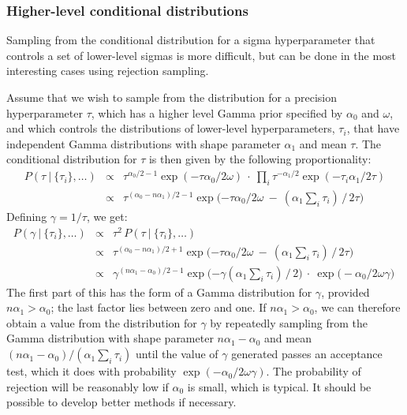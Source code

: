 \documentclass{report}[11pt]
\def\beq{\begin{eqnarray}}
\def\eeq{\end{eqnarray}}
\begin{document}
\subsubsection*{Higher-level conditional distributions}

Sampling from the conditional distribution for a sigma hyperparameter
that controls a set of lower-level sigmas is more difficult, but can
be done in the most interesting cases using rejection sampling.

Assume that we wish to sample from the distribution for a precision
hyperparameter $\tau$, which has a higher level Gamma prior specified
by $\alpha_0$ and $\omega$, and which controls the distributions of
lower-level hyperparameters, $\tau_i$, that have independent Gamma
distributions with shape parameter $\alpha_1$ and mean $\tau$.  The
conditional distribution for $\tau$ is then given by the following
proportionality:\beq
  P(\tau\ |\ \{\tau_i\}, \ldots) & \propto &
    \tau^{\alpha_0/2-1} \exp(-\tau\alpha_0/2\omega) \ \cdot\ 
    \prod_i \tau^{-\alpha_1/2} \exp(-\tau_i\alpha_1/2\tau) \\[3pt]
  & \propto &
    \tau^{(\alpha_0-n\alpha_1)/2-1} 
    \exp\Big({\textstyle-\tau\alpha_0/2\omega
           \ -\ (\alpha_1\sum\limits_i \tau_i)\,\big/\,2\tau}\Big)
\eeq%
Defining $\gamma=1/\tau$, we get:\beq
  P(\gamma\ |\ \{\tau_i\}, \ldots) & \propto & 
    \tau^2\,P(\tau\ |\ \{\tau_i\}, \ldots) \\[3pt]
  & \propto &
    \tau^{(\alpha_0-n\alpha_1)/2+1} 
    \exp\Big({\textstyle-\tau\alpha_0/2\omega
           \ -\ (\alpha_1\sum\limits_i \tau_i)\,\big/\,2\tau}\Big) \\[3pt]
  & \propto &
    \gamma^{(n\alpha_1-\alpha_0)/2-1} 
    \exp\Big({\textstyle -\gamma(\alpha_1\sum\limits_i \tau_i)\,\big/\,2}\Big)
    \ \cdot\ \exp\big(\!-\alpha_0/2\omega\gamma\big)\ 
\eeq%
The first part of this has the form of a Gamma distribution for
$\gamma$, provided $n\alpha_1>\alpha_0$; the last factor lies between
zero and one.  If $n\alpha_1>\alpha_0$, we can therefore obtain a
value from the distribution for $\gamma$ by repeatedly sampling from
the Gamma distribution with shape parameter $n\alpha_1\!-\!\alpha_0$
and mean $(n\alpha_1\!-\!\alpha_0)/(\alpha_1\sum\limits_i \tau_i)$
until the value of $\gamma$ generated passes an acceptance test,
which it does with probability $\exp(-\alpha_0/2\omega\gamma)$.  The
probability of rejection will be reasonably low if $\alpha_0$ is
small, which is typical.  It should be possible to develop better
methods if necessary.
\end{document}
